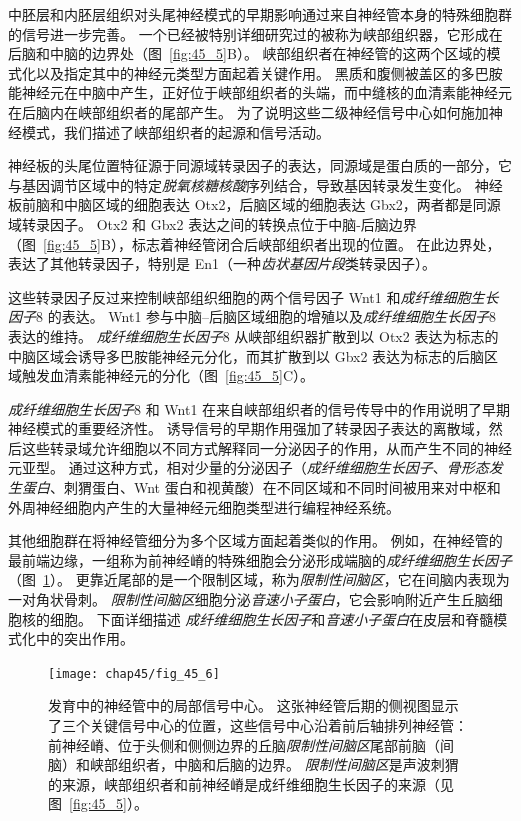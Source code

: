 中胚层和内胚层组织对头尾神经模式的早期影响通过来自神经管本身的特殊细胞群的信号进一步完善。
一个已经被特别详细研究过的被称为峡部组织器，它形成在后脑和中脑的边界处（图~\ref{fig:45_5}B）。
峡部组织者在神经管的这两个区域的模式化以及指定其中的神经元类型方面起着关键作用。
黑质和腹侧被盖区的多巴胺能神经元在中脑中产生，正好位于峡部组织者的头端，而中缝核的血清素能神经元在后脑内在峡部组织者的尾部产生。
为了说明这些二级神经信号中心如何施加神经模式，我们描述了峡部组织者的起源和信号活动。


神经板的头尾位置特征源于同源域转录因子的表达，同源域是蛋白质的一部分，它与基因调节区域中的特定\textit{脱氧核糖核酸}序列结合，导致基因转录发生变化。
神经板前脑和中脑区域的细胞表达 Otx2，后脑区域的细胞表达 Gbx2，两者都是同源域转录因子。
Otx2 和 Gbx2 表达之间的转换点位于中脑-后脑边界（图~\ref{fig:45_5}B），标志着神经管闭合后峡部组织者出现的位置。
在此边界处，表达了其他转录因子，特别是 En1（一种\textit{齿状基因片段}类转录因子）。


这些转录因子反过来控制峡部组织细胞的两个信号因子 Wnt1 和\textit{成纤维细胞生长因子}8 的表达。
Wnt1 参与中脑--后脑区域细胞的增殖以及\textit{成纤维细胞生长因子}8 表达的维持。
\textit{成纤维细胞生长因子}8 从峡部组织器扩散到以 Otx2 表达为标志的中脑区域会诱导多巴胺能神经元分化，而其扩散到以 Gbx2 表达为标志的后脑区域触发血清素能神经元的分化（图~\ref{fig:45_5}C）。


\textit{成纤维细胞生长因子}8 和 Wnt1 在来自峡部组织者的信号传导中的作用说明了早期神经模式的重要经济性。
诱导信号的早期作用强加了转录因子表达的离散域，然后这些转录域允许细胞以不同方式解释同一分泌因子的作用，从而产生不同的神经元亚型。
通过这种方式，相对少量的分泌因子（\textit{成纤维细胞生长因子}、\textit{骨形态发生蛋白}、刺猬蛋白、Wnt 蛋白和视黄酸）在不同区域和不同时间被用来对中枢和外周神经细胞内产生的大量神经元细胞类型进行编程神经系统。


其他细胞群在将神经管细分为多个区域方面起着类似的作用。
例如，在神经管的最前端边缘，一组称为前神经嵴的特殊细胞会分泌形成端脑的\textit{成纤维细胞生长因子}（图~\ref{fig:45_6}）。
更靠近尾部的是一个限制区域，称为\textit{限制性间脑区}，它在间脑内表现为一对角状骨刺。
\textit{限制性间脑区}细胞分泌\textit{音速小子蛋白}，它会影响附近产生丘脑细胞核的细胞。
下面详细描述 \textit{成纤维细胞生长因子}和\textit{音速小子蛋白}在皮层和脊髓模式化中的突出作用。


\begin{figure}[htbp]
	\centering
	\texttt{[image: chap45/fig\_45\_6]}
	\caption{发育中的神经管中的局部信号中心。
		这张神经管后期的侧视图显示了三个关键信号中心的位置，这些信号中心沿着前后轴排列神经管：
		前神经嵴、位于头侧和侧侧边界的丘脑\textit{限制性间脑区}尾部前脑（间脑）和峡部组织者，中脑和后脑的边界。
		\textit{限制性间脑区}是声波刺猬的来源，峡部组织者和前神经嵴是成纤维细胞生长因子的来源（见图~\ref{fig:45_5}）。}
	\label{fig:45_6}
\end{figure}



